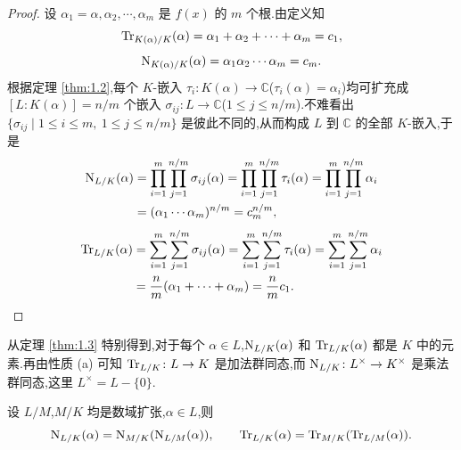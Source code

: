 \begin{proof}
设 $\alpha_1=\alpha,\alpha_2,\cdots,\alpha_m$ 是 $f(x)$ 的 $m$ 个根.由定义知
\[
  \mathrm{Tr}_{K(\alpha)/K}(\alpha)=\alpha_1+\alpha_2+\cdots+\alpha_m=c_1,
\]
\[
  \mathrm{N}_{K(\alpha)/K}(\alpha)=\alpha_1\alpha_2\cdots\alpha_m=c_m.
\]
根据定理 \ref{thm:1.2},每个 $K$-嵌入 $\tau_i\colon K(\alpha)\to\mathbb{C}$($\tau_i(\alpha)=\alpha_i$)均可扩充成 $[L:K(\alpha)]=n/m$ 个嵌入 $\sigma_{ij}\colon L\to\mathbb{C}$($1\leqslant j\leqslant n/m$).不难看出 $\{\sigma_{ij}\mid 1\leqslant i\leqslant m,\ 1\leqslant j\leqslant n/m\}$ 是彼此不同的,从而构成 $L$ 到 $\mathbb{C}$ 的全部 $K$-嵌入,于是
\begin{align*}
  \mathrm{N}_{L/K}(\alpha)
  &=\prod_{i=1}^{m}\prod_{j=1}^{n/m}\sigma_{ij}(\alpha)
   =\prod_{i=1}^{m}\prod_{j=1}^{n/m}\tau_i(\alpha)
   =\prod_{i=1}^{m}\prod_{j=1}^{n/m}\alpha_i\\
  &=(\alpha_1\cdots\alpha_m)^{n/m}=c_m^{n/m},
\end{align*}
\begin{align*}
  \mathrm{Tr}_{L/K}(\alpha)
  &=\sum_{i=1}^{m}\sum_{j=1}^{n/m}\sigma_{ij}(\alpha)
   =\sum_{i=1}^{m}\sum_{j=1}^{n/m}\tau_i(\alpha)
   =\sum_{i=1}^{m}\sum_{j=1}^{n/m}\alpha_i\\
  &=\frac{n}{m}(\alpha_1+\cdots+\alpha_m)=\frac{n}{m}c_1.
\end{align*}
\end{proof}

\begin{remark}
从定理 \ref{thm:1.3} 特别得到,对于每个 $\alpha\in L$,$\mathrm{N}_{L/K}(\alpha)$ 和 $\mathrm{Tr}_{L/K}(\alpha)$ 都是 $K$ 中的元素.再由性质 (a) 可知 $\mathrm{Tr}_{L/K}\colon L\to K$ 是加法群同态,而 $\mathrm{N}_{L/K}\colon L^\times\to K^\times$ 是乘法群同态,这里 $L^\times=L-\{0\}$.
\end{remark}

\begin{theorem}\label{thm:1.4}
设 $L/M$,$M/K$ 均是数域扩张,$\alpha\in L$,则
\[
  \mathrm{N}_{L/K}(\alpha)=\mathrm{N}_{M/K}(\mathrm{N}_{L/M}(\alpha)),\qquad
  \mathrm{Tr}_{L/K}(\alpha)=\mathrm{Tr}_{M/K}(\mathrm{Tr}_{L/M}(\alpha)).
\]
\end{theorem}

